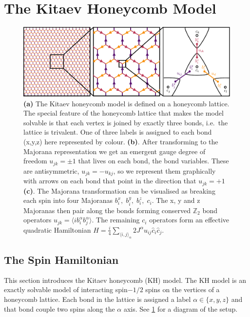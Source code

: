 \hypertarget{bg-hkm-model}{%
\section{The Kitaev Honeycomb Model}\label{bg-hkm-model}}

\hypertarget{fig:intro_figure_by_hand}{%
\begin{figure}
\centering
\includegraphics[width=1\textwidth,height=\textheight]{figure_code/amk_chapter/intro/honeycomb_zoom/intro_figure_by_hand}
\caption[{The Kitaev Honeycomb Model}]{\textbf{(a)} The Kitaev honeycomb model is defined on a honeycomb lattice. The special feature of the honeycomb lattice that makes the model solvable is that each vertex is joined by exactly three bonds, i.e.~the lattice is trivalent. One of three labels is assigned to each bond (x,y,z) here represented by colour. \textbf{(b)}. After transforming to the Majorana representation we get an emergent gauge degree of freedom \(u_{jk} = \pm 1\) that lives on each bond, the bond variables. These are antisymmetric, \(u_{jk} = -u_{kj}\), so we represent them graphically with arrows on each bond that point in the direction that \(u_{jk} = +1\) \textbf{(c)}. The Majorana transformation can be visualised as breaking each spin into four Majoranas \(b_i^x,\;b_i^y,\;b_i^z,\;c_i\). The x, y and z Majoranas then pair along the bonds forming conserved \(\mathbb{Z}_2\) bond operators \(u_{jk} = \langle i b_i^\alpha b_j^\alpha \rangle\). The remaining \(c_i\) operators form an effective quadratic Hamiltonian \(H = \frac{i}{4} \sum_{\langle i,j\rangle_\alpha} 2J^{\alpha} u_{ij} \hat{c}_i \hat{c}_j\).}
\label{fig:intro_figure_by_hand}
\end{figure}
}

\hypertarget{the-spin-hamiltonian}{%
\subsection{The Spin Hamiltonian}\label{the-spin-hamiltonian}}

This section introduces the Kitaev honeycomb (KH) model. The KH model is an exactly solvable model of interacting spin\(-1/2\) spins on the vertices of a honeycomb lattice. Each bond in the lattice is assigned a label \(\alpha \in \{ x, y, z\}\) and that bond couple two spins along the \(\alpha\) axis. See \cref{fig:intro_figure_by_hand} for a diagram of the setup.


